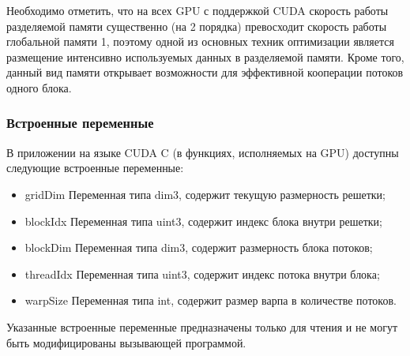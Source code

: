 \documentclass[a4paper, 12pt]{article}
\begin{document}
Необходимо отметить, что на всех GPU с поддержкой CUDA скорость работы разделяемой памяти существенно (на 2 порядка) превосходит скорость работы глобальной памяти 1, поэтому одной из основных техник 
оптимизации является размещение интенсивно используемых данных в 
разделяемой памяти. Кроме того, данный вид памяти открывает 
возможности для эффективной кооперации потоков одного блока. 

\subsubsection{Встроенные переменные} 
В приложении на языке CUDA C (в функциях, 
исполняемых на GPU) доступны следующие встроенные переменные:
\begin{itemize}
    \item gridDim Переменная типа dim3, содержит текущую размерность решетки; 
    \item blockIdx Переменная типа uint3, содержит индекс блока внутри решетки; 
    \item blockDim Переменная типа dim3, содержит размерность блока потоков;
    \item threadIdx Переменная типа uint3, содержит индекс потока внутри блока; 
    \item warpSize Переменная типа int, содержит размер варпа в количестве 
    потоков.
\end{itemize}
Указанные встроенные переменные предназначены только для чтения и не 
могут быть модифицированы вызывающей программой.
\end{document}
